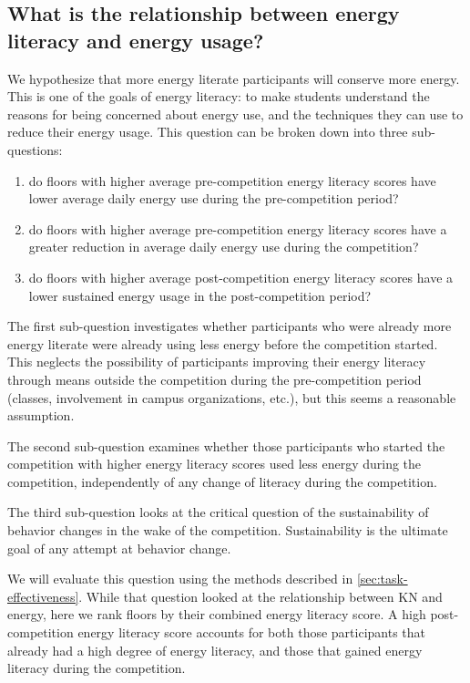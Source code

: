 \subsection{What is the relationship between energy literacy and energy usage?}

We hypothesize that more energy literate participants will conserve more energy. This is one of the goals of energy literacy: to make students understand the reasons for being concerned about energy use, and the techniques they can use to reduce their energy usage. This question can be broken down into three sub-questions:

\begin{enumerate}
	\item do floors with higher average pre-competition energy literacy scores have lower average daily energy use during the pre-competition period?
	\item do floors with higher average pre-competition energy literacy scores have a greater reduction in average daily energy use during the competition?
	\item do floors with higher average post-competition energy literacy scores have a lower sustained energy usage in the post-competition period?
\end{enumerate}

The first sub-question investigates whether participants who were already more energy literate were already using less energy before the competition started. This neglects the possibility of participants improving their energy literacy through means outside the competition during the pre-competition period (classes, involvement in campus organizations, etc.), but this seems a reasonable assumption.

The second sub-question examines whether those participants who started the competition with higher energy literacy scores used less energy during the competition, independently of any change of literacy during the competition.

The third sub-question looks at the critical question of the sustainability of behavior changes in the wake of the competition. Sustainability is the ultimate goal of any attempt at behavior change.

We will evaluate this question using the methods described in \autoref{sec:task-effectiveness}. While that question looked at the relationship between KN and energy, here we rank floors by their combined energy literacy score. A high post-competition energy literacy score accounts for both those participants that already had a high degree of energy literacy, and those that gained energy literacy during the competition.

